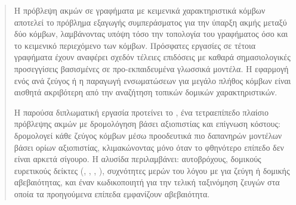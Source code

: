 \begin{abstract}
    Η πρόβλεψη ακμών σε γραφήματα με κειμενικά χαρακτηριστικά κόμβων αποτελεί το πρόβλημα
    εξαγωγής συμπεράσματος για την ύπαρξη ακμής μεταξύ δύο κόμβων, λαμβάνοντας υπόψη
    τόσο την τοπολογία του γραφήματος όσο και το κειμενικό περιεχόμενο των κόμβων.
    Πρόσφατες εργασίες σε τέτοια γραφήματα έχουν αναφέρει σχεδόν τέλειες επιδόσεις με
    καθαρά σημασιολογικές προσεγγίσεις βασισμένες σε προ-εκπαιδευμένα γλωσσικά
    μοντέλα.
    Η εφαρμογή ενός  ανά ζεύγος ή η παραγωγή
    ενσωματώσεων για μεγάλο πλήθος κόμβων είναι αισθητά ακριβότερη από την
    αναζήτηση τοπικών δομικών χαρακτηριστικών.

    Η παρούσα διπλωματική εργασία προτείνει το \textbf{}, ένα
    τετραεπίπεδο πλαίσιο πρόβλεψης ακμών με δρομολόγηση βάσει αξιοπιστίας και
    επίγνωση κόστους: δρομολογεί κάθε ζεύγος κόμβων μέσω προοδευτικά
    πιο δαπανηρών μοντέλων βάσει ορίων αξιοπιστίας, κλιμακώνοντας μόνο όταν το
    φθηνότερο επίπεδο δεν είναι αρκετά σίγουρο.
    Η αλυσίδα περιλαμβάνει: αυτοβρόχους,
    δομικούς ευρετικούς δείκτες (, ,
    , ), συχνότητες μερών του λόγου με
     για ζεύγη  ή δομικής αβεβαιότητας, και έναν κωδικοποιητή
     για την τελική ταξινόμηση ζευγών στα οποία τα
    προηγούμενα επίπεδα εμφανίζουν αβεβαιότητα.


\end{abstract}
